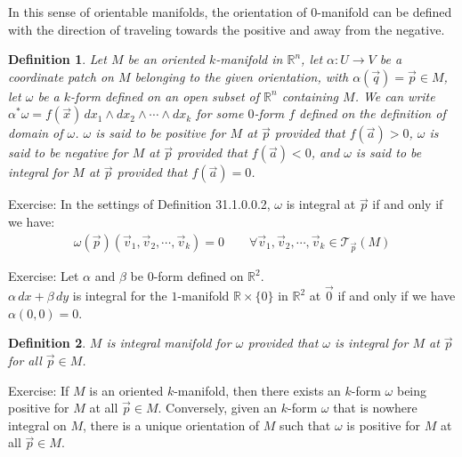 \documentclass[11pt,oneside]{book}
\theoremstyle{break}
\theoremstyle{break}
\newtheorem{defn}{Definition}[corL]
\newcommand{\R}{\mathbb{R}}
\newcommand{\T}{\mathcal{T}}
\newcommand{\exercise}{\color{green}Exercise: \color{black}}
\begin{document}
In this sense of orientable manifolds, the orientation of $0$-manifold can be defined with the direction of traveling towards the positive and away from the negative.\\

\begin{defn}
Let $M$ be an oriented $k$-manifold in $\R^n$, let $\alpha: U \to V$ be a coordinate patch on $M$ belonging to the given orientation, with $\alpha(\vec{q}) = \vec{p} \in M$, let $\omega$ be a $k$-form defined on an open subset of $\R^n$ containing $M$. We can write $\alpha^*\omega = f(\vec{x}) \, dx_1 \wedge dx_2 \wedge \cdots \wedge dx_k$ for some $0$-form $f$ defined on the definition of domain of $\omega$. $\omega$ is said to be positive for $M$ at $\vec{p}$ provided that $f(\vec{a})>0$, $\omega$ is said to be negative for $M$ at $\vec{p}$ provided that $f(\vec{a})<0$, and $\omega$ is said to be integral for $M$ at $\vec{p}$ provided that $f(\vec{a})=0$.
\end{defn}

\exercise In the settings of Definition 31.1.0.0.2, $\omega$ is integral at $\vec{p}$ if and only if we have:
\begin{align*}
\omega(\vec{p}) (\vec{v}_1,\vec{v}_2,\cdots, \vec{v}_k) = 0\qquad \forall \vec{v}_1,\vec{v}_2,\cdots, \vec{v}_k \in \T_{\vec{p}}(M) 
\end{align*} 

\exercise Let $\alpha$ and $\beta$ be $0$-form defined on $\R^2$.\\ 
$\alpha\, dx + \beta \, dy$ is integral for the $1$-manifold $\R\times \{0\}$ in $\R^2$ at $\vec{0}$ if and only if we have $\alpha(0,0) = 0$.\\

\begin{defn}
$M$ is integral manifold for $\omega$ provided that $\omega$ is integral for $M$ at $\vec{p}$ for all $\vec{p}\in M$. 
\end{defn}

\exercise If $M$ is an oriented $k$-manifold, then there exists an $k$-form $\omega$ being positive for $M$ at all $\vec{p} \in M$. Conversely, given an $k$-form $\omega$ that is nowhere integral on $M$, there is a unique orientation of $M$ such that $\omega$ is positive for $M$ at all $\vec{p}\in M$.\\
\end{document}
